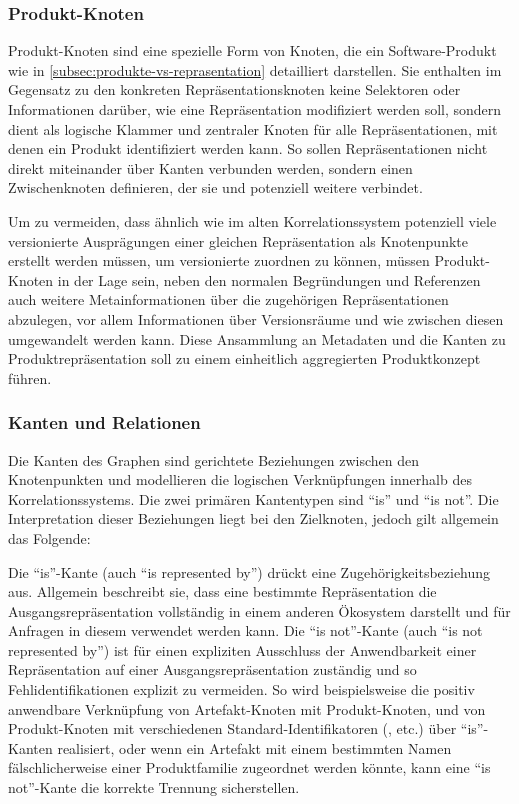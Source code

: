 \subsubsection{Produkt-Knoten}\label{subsubsec:model-product-node}
Produkt-Knoten sind eine spezielle Form von Knoten, die ein Software-Produkt wie in \autoref{subsec:produkte-vs-reprasentation} detailliert darstellen.
Sie enthalten im Gegensatz zu den konkreten Repräsentationsknoten keine Selektoren oder Informationen darüber, wie eine Repräsentation modifiziert werden soll, sondern dient als logische Klammer und zentraler Knoten für alle Repräsentationen, mit denen ein Produkt identifiziert werden kann.
So sollen Repräsentationen nicht direkt miteinander über Kanten verbunden werden, sondern einen Zwischenknoten definieren, der sie und potenziell weitere verbindet.

Um zu vermeiden, dass ähnlich wie im alten Korrelationssystem potenziell viele versionierte Ausprägungen einer gleichen Repräsentation als Knotenpunkte erstellt werden müssen, um versionierte  zuordnen zu können, müssen Produkt-Knoten in der Lage sein, neben den normalen Begründungen und Referenzen auch weitere Metainformationen über die zugehörigen Repräsentationen abzulegen, vor allem Informationen über Versionsräume und wie zwischen diesen umgewandelt werden kann.
Diese Ansammlung an Metadaten und die Kanten zu Produktrepräsentation soll zu einem einheitlich aggregierten Produktkonzept führen.

\subsubsection{Kanten und Relationen}\label{subsubsec:model-edges-relations}
Die Kanten des Graphen sind gerichtete Beziehungen zwischen den Knotenpunkten und modellieren die logischen Verknüpfungen innerhalb des Korrelationssystems.
Die zwei primären Kantentypen sind \enquote{is} und \enquote{is not}.
Die Interpretation dieser Beziehungen liegt bei den Zielknoten, jedoch gilt allgemein das Folgende:

Die \enquote{is}-Kante (auch \enquote{is represented by}) drückt eine Zugehörigkeitsbeziehung aus.
Allgemein beschreibt sie, dass eine bestimmte Repräsentation die Ausgangsrepräsentation vollständig in einem anderen Ökosystem darstellt und für Anfragen in diesem verwendet werden kann.
Die \enquote{is not}-Kante (auch \enquote{is not represented by}) ist für einen expliziten Ausschluss der Anwendbarkeit einer Repräsentation auf einer Ausgangsrepräsentation zuständig und so Fehlidentifikationen explizit zu vermeiden.
So wird beispielsweise die positiv anwendbare Verknüpfung von Artefakt-Knoten mit Produkt-Knoten, und von Produkt-Knoten mit verschiedenen Standard-Identifikatoren (,  etc.) über \enquote{is}-Kanten realisiert, oder wenn ein Artefakt mit einem bestimmten Namen fälschlicherweise einer Produktfamilie zugeordnet werden könnte, kann eine \enquote{is not}-Kante die korrekte Trennung sicherstellen.

